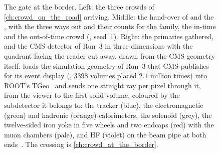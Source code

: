 \begin{figure}[htbp]\centering
\resizebox{\textwidth}{!}{}
\caption[The gate at the border: the road, the hand-over and the CMS
detector of 2025]{The gate at the border. Left: the three crowds of
\cref{ch:crowd_on_the_road} arriving. Middle: the hand-over of
 and the , with the three ways out
and their counts for the family, the in-time and the out-of-time crowd
(, seed~1). Right: the primaries gathered, and the
CMS detector of Run~3 in three dimensions with the quadrant facing the
reader cut away, drawn from the CMS geometry itself: 
loads the simulation geometry of Run~3 that CMS publishes for its event
display (, $3398$ volumes placed $2.1$ million
times) into ROOT's TGeo~\cite{Brun:2003TGeo} and sends one straight ray per
pixel through it, from the viewer to the first solid volume, coloured by the
subdetector it belongs to: the tracker (blue), the electromagnetic (green)
and hadronic (orange) calorimeters, the solenoid (grey), the twelve-sided
iron yoke in five wheels and two endcaps (red) with the muon chambers
(pale), and HF (violet) on the beam pipe at both
ends~\cite{CMS:2008xjf,CMS:2024aqx}. The crossing is
\cref{ch:crowd_at_the_border}.}
\label{fig:crossing_the_border:gate}
\end{figure}

